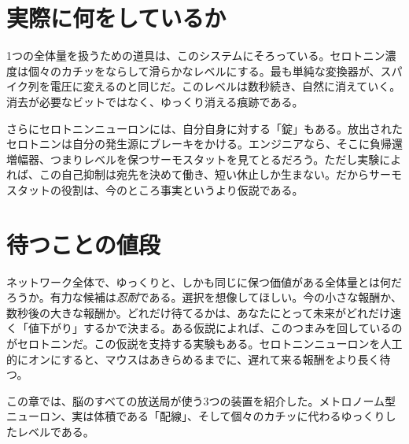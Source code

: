 \section*{実際に何をしているか}

1つの全体量を扱うための道具は、このシステムにそろっている。セロトニン濃度は個々のカチッをならして滑らかなレベルにする。最も単純な変換器が、スパイク列を電圧に変えるのと同じだ。このレベルは数秒続き、自然に消えていく。消去が必要なビットではなく、ゆっくり消える痕跡である。

さらにセロトニンニューロンには、自分自身に対する「錠」もある。放出されたセロトニンは自分の発生源にブレーキをかける。エンジニアなら、そこに負帰還増幅器、つまりレベルを保つサーモスタットを見てとるだろう。ただし実験によれば、この自己抑制は宛先を決めて働き、短い休止しか生まない。だからサーモスタットの役割は、今のところ事実というより仮説である。

\section*{待つことの値段}

ネットワーク全体で、ゆっくりと、しかも同じに保つ価値がある全体量とは何だろうか。有力な候補は\emph{忍耐}である。選択を想像してほしい。今の小さな報酬か、数秒後の大きな報酬か。どれだけ待てるかは、あなたにとって未来がどれだけ速く「値下がり」するかで決まる。ある仮説によれば、このつまみを回しているのがセロトニンだ。この仮説を支持する実験もある。セロトニンニューロンを人工的にオンにすると、マウスはあきらめるまでに、遅れて来る報酬をより長く待つ。

この章では、脳のすべての放送局が使う3つの装置を紹介した。メトロノーム型ニューロン、実は体積である「配線」、そして個々のカチッに代わるゆっくりしたレベルである。

